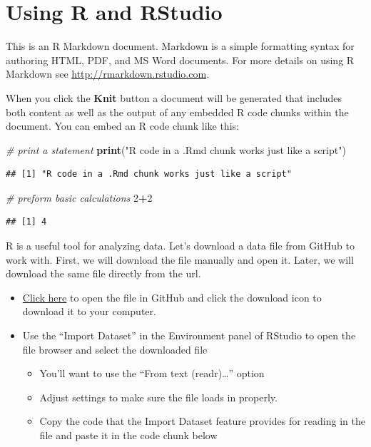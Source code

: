 \documentclass[
]{book}
\newenvironment{Shaded}{\begin{snugshade}}{\end{snugshade}}
\newcommand{\CommentTok}[1]{\textcolor[rgb]{0.56,0.35,0.01}{\textit{#1}}}
\newcommand{\DecValTok}[1]{\textcolor[rgb]{0.00,0.00,0.81}{#1}}
\newcommand{\FunctionTok}[1]{\textcolor[rgb]{0.13,0.29,0.53}{\textbf{#1}}}
\newcommand{\NormalTok}[1]{#1}
\newcommand{\SpecialCharTok}[1]{\textcolor[rgb]{0.81,0.36,0.00}{\textbf{#1}}}
\newcommand{\StringTok}[1]{\textcolor[rgb]{0.31,0.60,0.02}{#1}}
\begin{document}
\hypertarget{using-r-and-rstudio}{%
\section{Using R and RStudio}\label{using-r-and-rstudio}}

This is an R Markdown document. Markdown is a simple formatting syntax for authoring HTML, PDF, and MS Word documents. For more details on using R Markdown see \url{http://rmarkdown.rstudio.com}.

When you click the \textbf{Knit} button a document will be generated that includes both content as well as the output of any embedded R code chunks within the document. You can embed an R code chunk like this:

\begin{Shaded}
\begin{Highlighting}[]
\CommentTok{\# print a statement}
\FunctionTok{print}\NormalTok{(}\StringTok{"R code in a .Rmd chunk works just like a script"}\NormalTok{)}
\end{Highlighting}
\end{Shaded}

\begin{verbatim}
## [1] "R code in a .Rmd chunk works just like a script"
\end{verbatim}

\begin{Shaded}
\begin{Highlighting}[]
\CommentTok{\# preform basic calculations}
\DecValTok{2}\SpecialCharTok{+}\DecValTok{2}
\end{Highlighting}
\end{Shaded}

\begin{verbatim}
## [1] 4
\end{verbatim}

R is a useful tool for analyzing data. Let's download a data file from GitHub to work with. First, we will download the file manually and open it. Later, we will download the same file directly from the url.

\begin{itemize}
\item
  \href{https://github.com/clstacy/GenomicDataAnalysis_Fa23/blob/main/data/ethanol_stress/msn2-4_mutants_EtOH.txt}{Click here} to open the file in GitHub and click the download icon to download it to your computer.
\item
  Use the ``Import Dataset'' in the Environment panel of RStudio to open the file browser and select the downloaded file

  \begin{itemize}
  \item
    You'll want to use the ``From text (readr)\ldots{}'' option
  \item
    Adjust settings to make sure the file loads in properly.
  \item
    Copy the code that the Import Dataset feature provides for reading in the file and paste it in the code chunk below
  \end{itemize}
\end{itemize}
\end{document}
